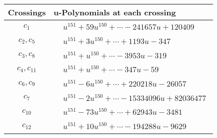 \documentclass[1p]{elsarticle_modified}
\theoremstyle{definition}
\begin{document}
\begin{tabular}{m{50pt}|m{274pt}}
Crossings & \hspace{64pt}u-Polynomials at each crossing \\
\hline $$\begin{aligned}c_{1}\end{aligned}$$&$\begin{aligned}
&u^{151}+59 u^{150}+\cdots-241657 u+120409
\end{aligned}$\\
\hline $$\begin{aligned}c_{2},c_{5}\end{aligned}$$&$\begin{aligned}
&u^{151}+3 u^{150}+\cdots+1193 u-347
\end{aligned}$\\
\hline $$\begin{aligned}c_{3},c_{8}\end{aligned}$$&$\begin{aligned}
&u^{151}+u^{150}+\cdots-3953 u-319
\end{aligned}$\\
\hline $$\begin{aligned}c_{4},c_{11}\end{aligned}$$&$\begin{aligned}
&u^{151}+u^{150}+\cdots-347 u-59
\end{aligned}$\\
\hline $$\begin{aligned}c_{6},c_{9}\end{aligned}$$&$\begin{aligned}
&u^{151}-6 u^{150}+\cdots+220218 u-26057
\end{aligned}$\\
\hline $$\begin{aligned}c_{7}\end{aligned}$$&$\begin{aligned}
&u^{151}-2 u^{150}+\cdots-15334096 u+82036477
\end{aligned}$\\
\hline $$\begin{aligned}c_{10}\end{aligned}$$&$\begin{aligned}
&u^{151}-73 u^{150}+\cdots+62943 u-3481
\end{aligned}$\\
\hline $$\begin{aligned}c_{12}\end{aligned}$$&$\begin{aligned}
&u^{151}+10 u^{150}+\cdots-194288 u-9629
\end{aligned}$\\
\hline
\end{tabular}\\~\\
\end{document}
